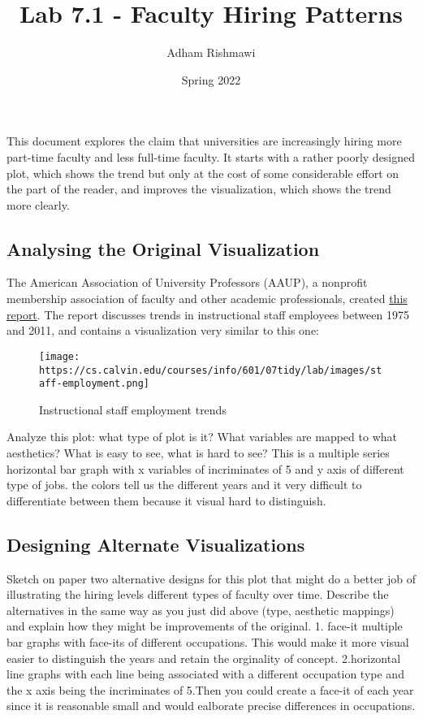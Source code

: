 \documentclass[
]{article}
\title{Lab 7.1 - Faculty Hiring Patterns}
\author{Adham Rishmawi}
\date{Spring 2022}
\begin{document}
\maketitle

This document explores the claim that universities are increasingly
hiring more part-time faculty and less full-time faculty. It starts with
a rather poorly designed plot, which shows the trend but only at the
cost of some considerable effort on the part of the reader, and improves
the visualization, which shows the trend more clearly.

\hypertarget{analysing-the-original-visualization}{%
\subsection{Analysing the Original
Visualization}\label{analysing-the-original-visualization}}

The American Association of University Professors (AAUP), a nonprofit
membership association of faculty and other academic professionals,
created
\href{https://www.aaup.org/sites/default/files/files/AAUP_Report_InstrStaff-75-11_apr2013.pdf}{this
report}. The report discusses trends in instructional staff employees
between 1975 and 2011, and contains a visualization very similar to this
one:

\begin{figure}
\centering
\texttt{[image: https://cs.calvin.edu/courses/info/601/07tidy/lab/images/staff-employment.png]}
\caption{Instructional staff employment trends}
\end{figure}

Analyze this plot: what type of plot is it? What variables are mapped to
what aesthetics? What is easy to see, what is hard to see? This is a
multiple series horizontal bar graph with x variables of incriminates of
5 and y axis of different type of jobs. the colors tell us the different
years and it very difficult to differentiate between them because it
visual hard to distinguish.

\hypertarget{designing-alternate-visualizations}{%
\subsection{Designing Alternate
Visualizations}\label{designing-alternate-visualizations}}

Sketch on paper two alternative designs for this plot that might do a
better job of illustrating the hiring levels different types of faculty
over time. Describe the alternatives in the same way as you just did
above (type, aesthetic mappings) and explain how they might be
improvements of the original. 1. face-it multiple bar graphs with
face-its of different occupations. This would make it more visual easier
to distinguish the years and retain the orginality of concept.
2.horizontal line graphs with each line being associated with a
different occupation type and the x axis being the incriminates of
5.Then you could create a face-it of each year since it is reasonable
small and would ealborate precise differences in occupations.
\end{document}
